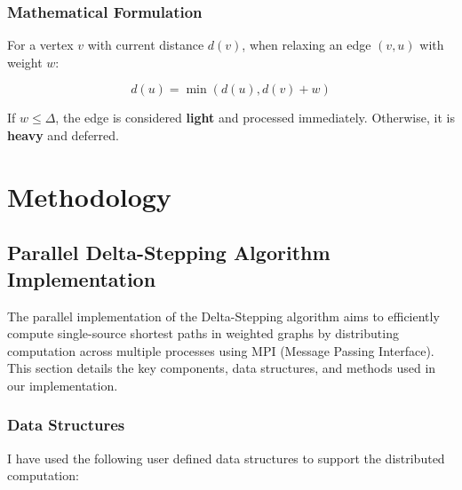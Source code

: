 \documentclass{article}
\begin{document}
\subsubsection*{Mathematical Formulation}
For a vertex \( v \) with current distance \( d(v) \), when relaxing an edge \( (v, u) \) with weight \( w \):

\[
  d(u) = \min(d(u), d(v) + w)
\]

If \( w \leq \Delta \), the edge is considered \textbf{light} and processed immediately. Otherwise, it is \textbf{heavy} and deferred.

\section*{Methodology}

\subsection*{Parallel Delta-Stepping Algorithm Implementation}

The parallel implementation of the Delta-Stepping algorithm aims to efficiently compute single-source shortest paths in weighted graphs by distributing computation across multiple processes using MPI (Message Passing Interface). This section details the key components, data structures, and methods used in our implementation.

\subsubsection*{Data Structures}

I have used the following user defined data structures to support the distributed computation:
\end{document}
